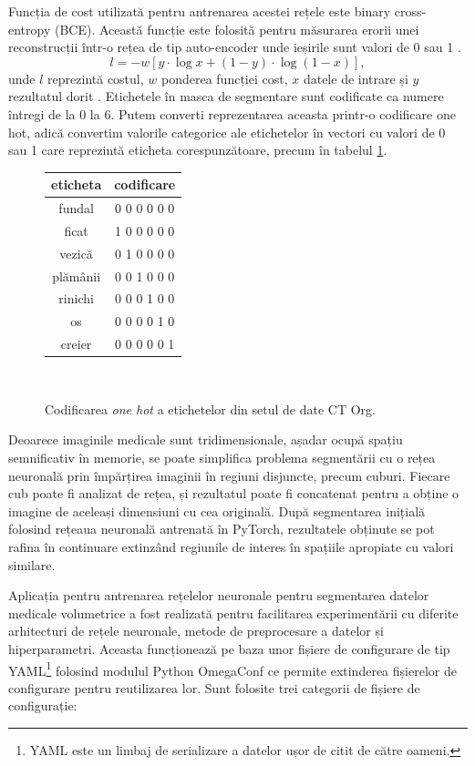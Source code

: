 Funcția de cost utilizată pentru antrenarea acestei rețele este binary cross-entropy (BCE). Această funcție este folosită pentru măsurarea erorii unei reconstrucții într-o rețea de tip auto-encoder unde ieșirile sunt valori de 0 sau 1 \cite{pytorchref}.
\begin{equation}
    l=-w [y \cdot \log x + (1 - y) \cdot \log (1 - x)],
\end{equation}
unde $l$ reprezintă costul, $w$ ponderea funcției cost, $x$ datele de intrare și $y$ rezultatul dorit  \cite{pytorchref}.
Etichetele în masca de segmentare sunt codificate ca numere întregi de la 0 la 6. Putem converti reprezentarea aceasta printr-o codificare one hot, adică convertim valorile categorice ale etichetelor în vectori cu valori de 0 sau 1 care reprezintă eticheta corespunzătoare, precum în tabelul \ref{fig:onehot}.

\begin{figure}[!htb]
\centering
\begin{tabular}{ || c | c || }
\hline
eticheta & codificare \\ [0.5ex] 
\hline
\hline
fundal & 0 0 0 0 0 0 \\
\hline
ficat & 1 0 0 0 0 0 \\
\hline
vezică & 0 1 0 0 0 0 \\
\hline
plămânii & 0 0 1 0 0 0 \\
\hline
rinichi & 0 0 0 1 0 0 \\
\hline
os & 0 0 0 0 1 0 \\
\hline
creier & 0 0 0 0 0 1 \\ [1ex] 
\hline
\end{tabular}
\\ [1ex] 
\caption{Codificarea \textit{one hot} a etichetelor din setul de date CT Org.}
\label{fig:onehot}
\end{figure}

Deoarece imaginile medicale sunt tridimensionale, așadar ocupă spațiu semnificativ în memorie, se poate simplifica problema segmentării cu o rețea neuronală prin împărțirea imaginii în regiuni disjuncte, precum cuburi. Fiecare cub poate fi analizat de rețea, și rezultatul poate fi concatenat pentru a obține o imagine de aceleași dimensiuni cu cea originală. După segmentarea inițială folosind rețeaua neuronală antrenată în PyTorch, rezultatele obținute se pot rafina în continuare extinzând regiunile de interes în spațiile apropiate cu valori similare.

Aplicația pentru antrenarea rețelelor neuronale pentru segmentarea datelor medicale volumetrice a fost realizată pentru facilitarea experimentării cu diferite arhitecturi de rețele neuronale, metode de preprocesare a datelor și hiperparametri. Aceasta funcționează pe baza unor fișiere de configurare de tip YAML\footnote{YAML este un limbaj de serializare a datelor ușor de citit de către oameni.} folosind modulul Python OmegaConf ce permite extinderea fișierelor de configurare pentru reutilizarea lor. Sunt folosite trei categorii de fișiere de configurație: 

